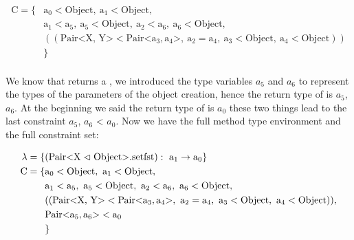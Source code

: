 \begin{align*}
    \text{C} = \{& \text{a}_0 < \text{Object}, \ \text{a}_1 < \text{Object}, \\
    &\text{a}_1 < \text{a}_5, \ \text{a}_5 < \text{Object}, \ \text{a}_2 < \text{a}_6, \ \text{a}_6 < \text{Object}, \\
    &(( \text{Pair<X, Y>} < \text{Pair<} \text{a}_3, \text{a}_4 \text{>}, \ \text{a}_2 = \text{a}_4, \ \text{a}_3 < \text{Object}, \ \text{a}_4 < \text{Object} ))\\
    &\}\\
\end{align*}

We know that  returns a , we introduced the type variables $a_5$ and $a_6$ to represent the types of the parameters of the object creation, hence the return type of  is $a_5$, $a_6$\inl{>}.
At the beginning we said the return type of  is $a_0$ these two things lead to the last constraint $a_5$, $a_6$\inl{>} < $a_0$.
Now we have the full method type environment and the full constraint set:

\begin{align*}
    \lambda = \{& ( \cxnm{Pair}{X}{Object}{setfst} ): \ \text{a}_1 \to \text{a}_0 \}\\
    \text{C} = \{& \text{a}_0 < \text{Object}, \ \text{a}_1 < \text{Object}, \\
    &\text{a}_1 < \text{a}_5, \ \text{a}_5 < \text{Object}, \ \text{a}_2 < \text{a}_6, \ \text{a}_6 < \text{Object}, \\
    &(( \text{Pair<X, Y>} < \text{Pair<} \text{a}_3, \text{a}_4 \text{>}, \ \text{a}_2 = \text{a}_4, \ \text{a}_3 < \text{Object}, \ \text{a}_4 < \text{Object} )),\\
    &\text{Pair<}\text{a}_5, \text{a}_6\text{>} < \text{a}_0\\
    &\}\\
\end{align*}
